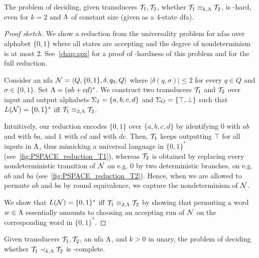 \begin{theorem}
\label{thm:equivalence_PSPACE-H}
The problem of deciding, given transducers $\mathcal{T}_1,\mathcal{T}_2$, whether $\mathcal{T}_1\equiv_{k,\Lambda} \mathcal{T}_2$, is \PSPACE-hard, even for $k=2$ and $\Lambda$ of constant size (given as a 4-state \gls{dfa}).
\end{theorem}
\begin{proof}[Proof sketch]
We show a reduction from the universality problem for \glspl{nfa} over alphabet $\{0,1\}$ where all states are accepting and the degree of nondeterminism is at most 2. See~\autoref{chap:apx} for a proof of \PSPACE-hardness of this problem and for the full reduction.

Consider an \gls{nfa} $\mathcal{N}=\left< Q,\{0,1\},\delta,q_0,Q\right>$ where $|\delta(q,\sigma)|\le 2$ for every $q\in Q$ and $\sigma\in \{0,1\}$. Set $\Lambda=(ab+cd)^*$. We construct two transducers $\mathcal{T}_1$ and $\mathcal{T}_2$ over input and output alphabets $\Sigma_{I}=\{a,b,c,d\}$ and $\Sigma_{O}=\{\top,\bot\}$ such that $L(\mathcal{N})=\{0,1\}^*$ iff $\mathcal{T}_1\equiv_{2,\Lambda}\mathcal{T}_2$. 

Intuitively, our reduction encodes $\{0,1\}$ over $\{a,b,c,d\}$ by identifying $0$ with $ab$ and with $ba$, and $1$ with $cd$ and with $dc$. Then, $\mathcal{T}_1$ keeps outputting $\top$ for all inputs in $\Lambda$, thus mimicking a universal language in $\{0,1\}^*$ (see~\autoref{fig:PSPACE_reduction_T1}), whereas $\mathcal{T}_2$ is obtained by replacing every nondeterministic transition of $\mathcal{N}$ on e.g. 0 by two deterministic branches, on e.g. $ab$ and $ba$ (see~\autoref{fig:PSPACE_reduction_T2}). Hence, when we are allowed to permute $ab$ and $ba$ by round equivalence, we capture the nondeterminism of $\mathcal{N}$.

We show that $L(\mathcal{N})=\{0,1\}^*$ iff $\mathcal{T}_1\equiv_{2,\Lambda}\mathcal{T}_2$ by showing that
permuting a word $w\in \Lambda$ essentially amounts to choosing an accepting run of $\mathcal{N}$ on the corresponding word in $\{0,1\}^*$.
\end{proof}

\begin{corollary}
\label{cor:PSPACE-C}
Given transducers $\mathcal{T}_1,\mathcal{T}_2$, an \gls{nfa} $\Lambda$, and $k>0$ in unary, the problem of deciding whether $\mathcal{T}_1\prec_{k,\Lambda}\mathcal{T}_2$ is \PSPACE-complete.
\end{corollary}
